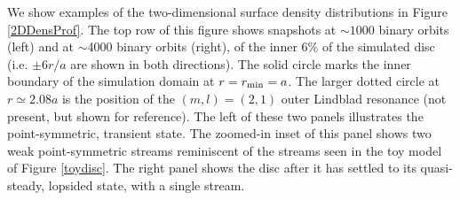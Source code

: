 We show examples of the two-dimensional surface density distributions
in Figure \ref{2DDensProf}.  The top row of this figure shows
snapshots at $\sim1000$ binary orbits (left) and at $\sim$4000 binary
orbits (right), of the inner 6$\%$ of the simulated disc (i.e. $\pm 6 r/a$ are
shown in both directions).  The solid circle marks the inner boundary
of the simulation domain at $r=r_{\rm{min}}=a$.  The larger dotted
circle at $r\simeq2.08a$ is the position of the $(m,l)=(2,1)$ outer
Lindblad resonance (not present, but shown for reference).  The left of these two
panels illustrates the point-symmetric, transient state. The
zoomed-in inset of this panel shows two weak point-symmetric streams reminiscent of the streams seen in the toy
model of Figure \ref{toydisc}. The right panel shows the disc after it
has settled to its quasi-steady, lopsided state, with a single stream.


